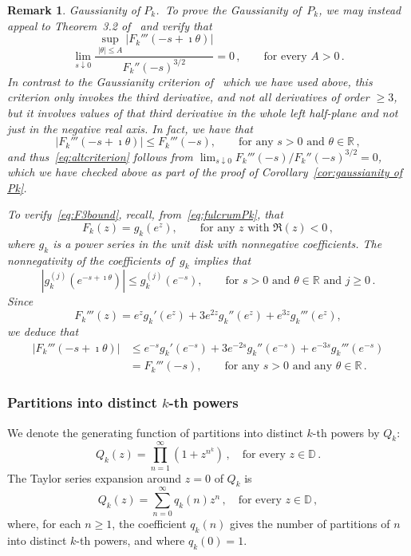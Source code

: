 \documentclass[12pt]{amsart}
\newtheorem{remark}{Remark}[section]
\theoremstyle{definition}
\begin{document}
\begin{remark}\textit{Gaussianity of $P_k$.}\label{rem:altGaussianityPk}\rm\,
To prove the Gaussianity of~$P_k$, we may instead appeal to Theorem~3.2 of~\cite{CFMK}
and verify that
\begin{equation}\label{eq:altcriterion}
\lim_{s\downarrow 0} \frac{\sup_{|\theta|\le A} |F_k'''(-s+\imath \theta)|}{F_k''(-s)^{3/2}} = 0\,, \qquad \text{for every } A>0\,.
\end{equation}
In contrast to the Gaussianity criterion of~\cite{MaciaGaussianity} which we have used above, this criterion
only invokes the third derivative, and not all derivatives of order $\ge 3$, but it involves values
of that third derivative in the whole left half-plane and not just in the negative real axis.
In fact, we have that
\begin{equation}\label{eq:F3bound}
|F_k'''(-s+\imath \theta)| \le F_k'''(-s), \qquad \text{for any } s>0 \text{ and } \theta\in\mathbb{R}\,,
\end{equation}
and thus~\eqref{eq:altcriterion} follows from $\lim_{s\downarrow 0} F_k'''(-s)/F_k''(-s)^{3/2}=0$, which we have checked above
as part of the proof of Corollary~\ref{cor:gaussianity of Pk}.
\smallskip

To verify~\eqref{eq:F3bound}, recall, from~\eqref{eq:fulcrumPk}, that
\[
F_k(z) = g_k(e^z), \qquad \text{for any } z \text{ with } \Re(z)<0\,,
\]
where $g_k$ is a power series in the unit disk with nonnegative coefficients. The nonnegativity of the coefficients of~$g_k$ implies that
\[
|g_k^{(j)}(e^{-s+\imath \theta})| \le g_k^{(j)}(e^{-s}), \qquad \text{for } s>0 \text{ and } \theta\in\mathbb{R} \text{ and } j\ge 0\,.
\]
Since
\[
F_k'''(z) = e^z g_k'(e^z) + 3 e^{2z} g_k''(e^z) + e^{3z} g_k'''(e^z),
\]
we deduce that
\begin{align*}
|F_k'''(-s+\imath \theta)| &\le e^{-s} g_k'(e^{-s}) + 3 e^{-2s} g_k''(e^{-s}) + e^{-3s} g_k'''(e^{-s})\\
&= F_k'''(-s), \qquad \text{for any } s>0 \text{ and any } \theta\in\mathbb{R}\,.
\end{align*}
\end{remark}


\subsubsection{Partitions into distinct $k$-th powers} We denote the generating function of partitions into distinct $k$-th powers by $Q_k$:
$$Q_k(z)=\prod_{n=1}^\infty (1+z^{n^k})\, , \quad \mbox{for every $z \in \mathbb{D}$}\,.$$
The Taylor series expansion around $z=0$ of $Q_k$ is
$$Q_k(z)=\sum_{n=0}^\infty q_k(n) z^n\, , \quad \mbox{for every $z \in \mathbb{D}$}\,,$$
where, for each $n \ge 1$, the coefficient $q_k(n)$ gives the number of partitions of $n$ into distinct $k$-th powers, and where $q_k(0)=1$.
\end{document}
